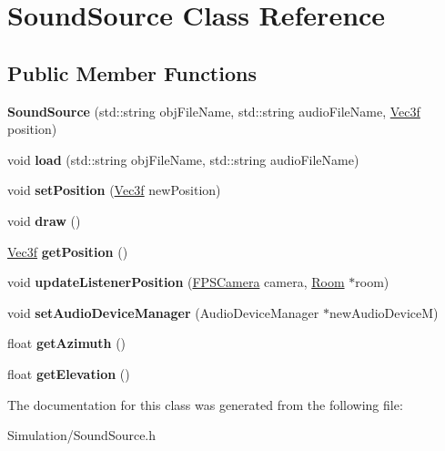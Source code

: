\hypertarget{class_sound_source}{}\section{Sound\+Source Class Reference}
\label{class_sound_source}
\subsection*{Public Member Functions}
\begin{DoxyCompactItemize}
\item 
\mbox{\label{class_sound_source_a0e8598ca46246f97d0b75f3aa8568393}} 
{\bfseries Sound\+Source} (std\+::string obj\+File\+Name, std\+::string audio\+File\+Name, \hyperlink{struct_vec3f}{Vec3f} position)
\item 
\mbox{\label{class_sound_source_a8d8f35750cc50c157952235a1edcc73f}} 
void {\bfseries load} (std\+::string obj\+File\+Name, std\+::string audio\+File\+Name)
\item 
\mbox{\label{class_sound_source_a3404e95f1b5e4a6bb5bc0e17f8e1d7b7}} 
void {\bfseries set\+Position} (\hyperlink{struct_vec3f}{Vec3f} new\+Position)
\item 
\mbox{\label{class_sound_source_a253d00a40d2a04a07f07467928d06075}} 
void {\bfseries draw} ()
\item 
\mbox{\label{class_sound_source_aa3844be6e27ef029372de96f22966cc0}} 
\hyperlink{struct_vec3f}{Vec3f} {\bfseries get\+Position} ()
\item 
\mbox{\label{class_sound_source_ae02dcef73f7add2694e0b94e3e0ba558}} 
void {\bfseries update\+Listener\+Position} (\hyperlink{class_f_p_s_camera}{F\+P\+S\+Camera} camera, \hyperlink{class_room}{Room} $\ast$room)
\item 
\mbox{\label{class_sound_source_ab0103624319c87601768bbececff966c}} 
void {\bfseries set\+Audio\+Device\+Manager} (Audio\+Device\+Manager $\ast$new\+Audio\+DeviceM)
\item 
\mbox{\label{class_sound_source_a433d013a27025828b7a7e4c568ba5435}} 
float {\bfseries get\+Azimuth} ()
\item 
\mbox{\label{class_sound_source_a3d528bee453f0458956e868f56eedb8d}} 
float {\bfseries get\+Elevation} ()
\end{DoxyCompactItemize}


The documentation for this class was generated from the following file\+:\begin{DoxyCompactItemize}
\item 
Simulation/Sound\+Source.\+h\end{DoxyCompactItemize}
